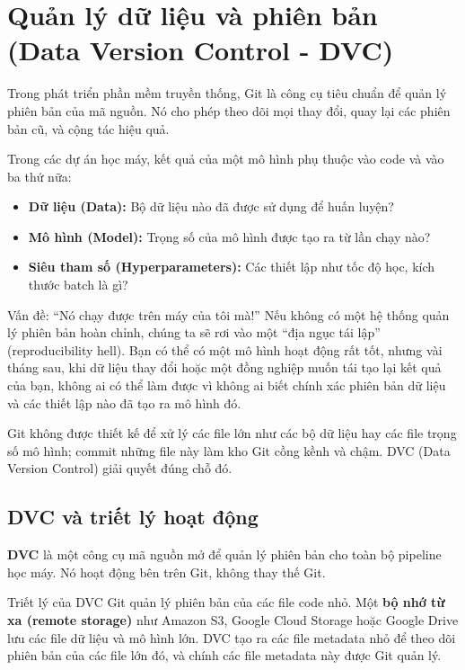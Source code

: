 
\section{Quản lý dữ liệu và phiên bản (Data Version Control - DVC)}
\label{sec:dvc}

Trong phát triển phần mềm truyền thống, Git là công cụ tiêu chuẩn để quản lý phiên bản của mã nguồn. Nó cho phép theo dõi mọi thay đổi, quay lại các phiên bản cũ, và cộng tác hiệu quả.

Trong các dự án học máy, kết quả của một mô hình phụ thuộc vào code và vào ba thứ nữa:
\begin{itemize}
    \item \textbf{Dữ liệu (Data):} Bộ dữ liệu nào đã được sử dụng để huấn luyện?
    \item \textbf{Mô hình (Model):} Trọng số của mô hình được tạo ra từ lần chạy nào?
    \item \textbf{Siêu tham số (Hyperparameters):} Các thiết lập như tốc độ học, kích thước batch là gì?
\end{itemize}

\begin{pitfall}{Vấn đề: “Nó chạy được trên máy của tôi mà!”}
Nếu không có một hệ thống quản lý phiên bản hoàn chỉnh, chúng ta sẽ rơi vào một “địa ngục tái lập” (reproducibility hell). Bạn có thể có một mô hình hoạt động rất tốt, nhưng vài tháng sau, khi dữ liệu thay đổi hoặc một đồng nghiệp muốn tái tạo lại kết quả của bạn, không ai có thể làm được vì không ai biết chính xác phiên bản dữ liệu và các thiết lập nào đã tạo ra mô hình đó.
\end{pitfall}

Git không được thiết kế để xử lý các file lớn như các bộ dữ liệu hay các file trọng số mô hình; commit những file này làm kho Git cồng kềnh và chậm. DVC (Data Version Control) giải quyết đúng chỗ đó.

\subsection{DVC và triết lý hoạt động}
\label{ssec:what_is_dvc}

\textbf{DVC} là một công cụ mã nguồn mở để quản lý phiên bản cho toàn bộ pipeline học máy. Nó hoạt động bên trên Git, không thay thế Git.

\begin{keyidea}{Triết lý của DVC}
Git quản lý phiên bản của các file code nhỏ. Một \textbf{bộ nhớ từ xa (remote storage)} như Amazon S3, Google Cloud Storage hoặc Google Drive lưu các file dữ liệu và mô hình lớn. DVC tạo ra các file metadata nhỏ để theo dõi phiên bản của các file lớn đó, và chính các file metadata này được Git quản lý.
\end{keyidea}

